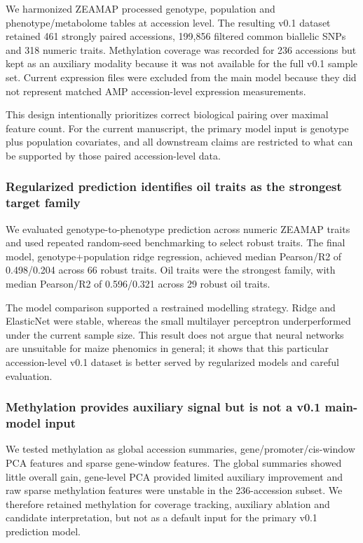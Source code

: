 \documentclass[
]{article}
\begin{document}
We harmonized ZEAMAP processed genotype, population and
phenotype/metabolome tables at accession level. The resulting v0.1
dataset retained 461 strongly paired accessions, 199,856 filtered common
biallelic SNPs and 318 numeric traits. Methylation coverage was recorded
for 236 accessions but kept as an auxiliary modality because it was not
available for the full v0.1 sample set. Current expression files were
excluded from the main model because they did not represent matched AMP
accession-level expression measurements.

This design intentionally prioritizes correct biological pairing over
maximal feature count. For the current manuscript, the primary model
input is genotype plus population covariates, and all downstream claims
are restricted to what can be supported by those paired accession-level
data.

\subsubsection{Regularized prediction identifies oil traits as the
strongest target
family}\label{regularized-prediction-identifies-oil-traits-as-the-strongest-target-family}

We evaluated genotype-to-phenotype prediction across numeric ZEAMAP
traits and used repeated random-seed benchmarking to select robust
traits. The final model, genotype+population ridge regression, achieved
median Pearson/R2 of 0.498/0.204 across 66 robust traits. Oil traits
were the strongest family, with median Pearson/R2 of 0.596/0.321 across
29 robust oil traits.

The model comparison supported a restrained modelling strategy. Ridge
and ElasticNet were stable, whereas the small multilayer perceptron
underperformed under the current sample size. This result does not argue
that neural networks are unsuitable for maize phenomics in general; it
shows that this particular accession-level v0.1 dataset is better served
by regularized models and careful evaluation.

\subsubsection{Methylation provides auxiliary signal but is not a v0.1
main-model
input}\label{methylation-provides-auxiliary-signal-but-is-not-a-v0.1-main-model-input}

We tested methylation as global accession summaries,
gene/promoter/cis-window PCA features and sparse gene-window features.
The global summaries showed little overall gain, gene-level PCA provided
limited auxiliary improvement and raw sparse methylation features were
unstable in the 236-accession subset. We therefore retained methylation
for coverage tracking, auxiliary ablation and candidate interpretation,
but not as a default input for the primary v0.1 prediction model.
\end{document}
